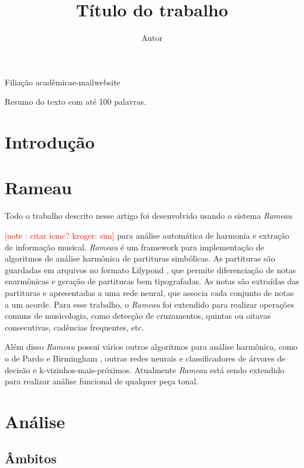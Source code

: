 \documentclass{article}
\newcounter{notecounter}
\newcommand{\note}[1]{
  \addtocounter{notecounter}{1}
  \textcolor{red}{[note \arabic{notecounter}: #1]}
}
\newcommand{\rameau}{\textit{Rameau}}
\begin{document}
\graphicspath{{figs/}}

\title{Título do trabalho}
\author{Autor}{Filiação acadêmica}{e-mail}{website}

\begin{sumario}
  Resumo do texto com até 100 palavras.  
\end{sumario}


\section{Introdução}
\label{sec:introducao}


\section{Rameau}
\label{sec:rameau}

Todo o trabalho descrito nesse artigo foi desenvolvido usando o
sistema \rameau{} \note{citar icmc? kroger: sim} para análise
automática de harmonia e extração de informação musical. \rameau{} é
um framework para implementação de algoritmos de análise harmônica de
partituras simbólicas. As partituras são guardadas em arquivos no
formato Lilypond \cite{nienhuys.ea08:lilypond}, que permite
diferenciação de notas enarmônicas e geração de partituras bem
tipografadas. As notas são extraídas das partituras e apresentadas a
uma rede neural, que associa cada conjunto de notas a um acorde. Para
esse trabalho, o \rameau{} foi extendido para realizar operações
comuns de musicologia, como detecção de cruzamentos, quintas ou
oitavas consecutivas, cadências frequentes, etc.

Além disso \rameau{}  possui vários outros algoritmos para análise
harmônica, como o de Pardo e Birmingham \cite{pardo.ea00:automated},
outras redes neurais e classificadores de árvores de decisão e
k-vizinhos-mais-próximos. Atualmente \rameau{}  está sendo extendido para
realizar análise funcional de qualquer peça tonal.

\section{Análise}
\label{sec:analise}

\subsection{Âmbitos}
\label{sec:ambitos}
\end{document}
